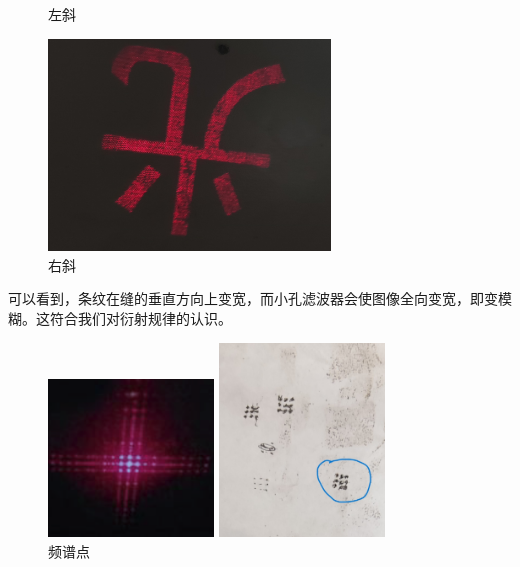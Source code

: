 \documentclass[11pt]{article}
\begin{document}
\begin{enumerate}
\begin{figure}[H]
\begin{minipage}[t]{0.49\linewidth}
            \caption{左斜}
        \end{minipage}
        \begin{minipage}[t]{0.49\linewidth}
            \centering
            \includegraphics[width=7.5cm]{Fig/5-右斜.jpg}
            \caption{右斜}
        \end{minipage}
    \end{figure}
    \par \hspace*{2em}可以看到，条纹在缝的垂直方向上变宽，而小孔滤波器会使图像全向变宽，即变模糊。这符合我们对衍射规律的认识。
    \begin{figure}[H]
        \centering
        \begin{minipage}[t]{0.3\linewidth}
            \centering
            \includegraphics[width=4.4cm]{Fig/6.png}
            \caption{频谱点}
        \end{minipage}
        \begin{minipage}[t]{0.34\linewidth}
            \centering
            \includegraphics[width=4.4cm]{Fig/7.jpg}

\end{minipage}
\end{figure}
\end{enumerate}
\end{document}
